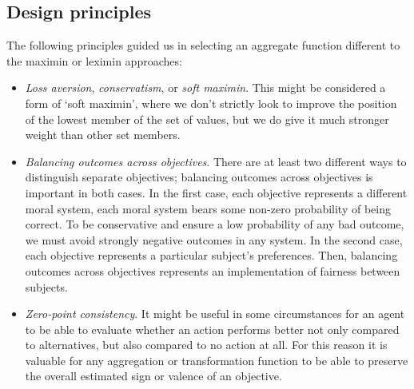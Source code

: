 
\subsection{Design principles}
The following principles guided us in selecting an aggregate function different to the maximin or leximin approaches:
\begin{itemize}
    \item \textit{Loss aversion}, \textit{conservatism}, or \textit{soft maximin}. This might be considered a form of `soft maximin', where we don't strictly look to improve the position of the lowest member of the set of values, but we do give it much stronger weight than other set members.
    \item \textit{Balancing outcomes across objectives}. There are at least two different ways to distinguish separate objectives; balancing outcomes across objectives is important in both cases. In the first case, each objective represents a different moral system, each moral system bears some non-zero probability of being correct. To be conservative and ensure a low probability of any bad outcome, we must avoid strongly negative outcomes in any system. In the second case, each objective represents a particular subject's preferences. Then, balancing outcomes across objectives represents an implementation of fairness between subjects.
    \item \textit{Zero-point consistency}. It might be useful in some circumstances for an agent to be able to evaluate whether an action performs better not only compared to alternatives, but also compared to no action at all. For this reason it is valuable for any aggregation or transformation function to be able to preserve the overall estimated sign or valence of an objective.
\end{itemize}

